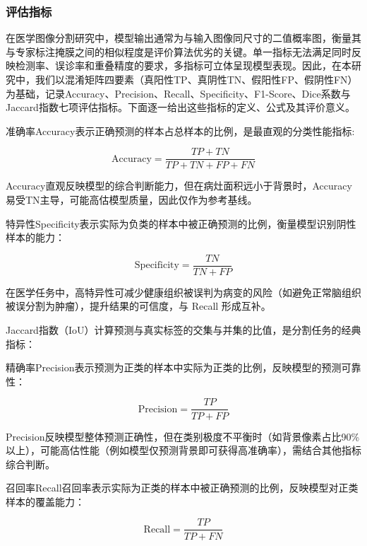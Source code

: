 \subsubsection{评估指标}

在医学图像分割研究中，模型输出通常为与输入图像同尺寸的二值概率图，衡量其与专家标注掩膜之间的相似程度是评价算法优劣的关键。单一指标无法满足同时反映检测率、误诊率和重叠精度的要求，多指标可立体呈现模型表现。因此，在本研究中，我们以混淆矩阵四要素（真阳性TP、真阴性TN、假阳性FP、假阴性FN）为基础，记录Accuracy、Precision、Recall、Specificity、F1-Score、Dice系数与Jaccard指数七项评估指标。下面逐一给出这些指标的定义、公式及其评价意义。

准确率Accuracy表示正确预测的样本占总样本的比例，是最直观的分类性能指标:

\begin{equation}
    \mathrm{Accuracy}=\frac{TP+TN}{TP+TN+FP+FN}
\end{equation}

Accuracy直观反映模型的综合判断能力，但在病灶面积远小于背景时，Accuracy易受TN主导，可能高估模型质量，因此仅作为参考基线。

特异性Specificity表示实际为负类的样本中被正确预测的比例，衡量模型识别阴性样本的能力：

\begin{equation}
    \mathrm{Specificity}=\frac{T N}{T N+F P}
\end{equation}

在医学任务中，高特异性可减少健康组织被误判为病变的风险（如避免正常脑组织被误分割为肿瘤），提升结果的可信度，与 Recall 形成互补。

Jaccard指数（IoU）计算预测与真实标签的交集与并集的比值，是分割任务的经典指标：

精确率Precision表示预测为正类的样本中实际为正类的比例，反映模型的预测可靠性：

\begin{equation}
    \mathrm{Precision}=\frac{T P}{T P+F P}
\end{equation}

Precision反映模型整体预测正确性，但在类别极度不平衡时（如背景像素占比90\%以上），可能高估性能（例如模型仅预测背景即可获得高准确率），需结合其他指标综合判断。

召回率Recall召回率表示实际为正类的样本中被正确预测的比例，反映模型对正类样本的覆盖能力：

\begin{equation}
    \mathrm{Recall}=\frac{T P}{T P+F N} 
\end{equation}

